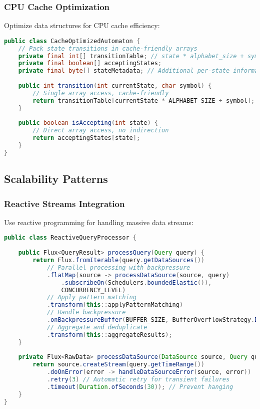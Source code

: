 \documentclass[11pt,a4paper]{article}
\begin{document}
\subsubsection{CPU Cache Optimization}

Optimize data structures for CPU cache efficiency:

\begin{lstlisting}[language=Java, caption=Cache-Friendly Data Structures]
public class CacheOptimizedAutomaton {
    // Pack state transitions in cache-friendly arrays
    private final int[] transitionTable; // state * alphabet_size + symbol = next_state
    private final boolean[] acceptingStates;
    private final byte[] stateMetadata; // Additional per-state information
    
    public int transition(int currentState, char symbol) {
        // Single array access, cache-friendly
        return transitionTable[currentState * ALPHABET_SIZE + symbol];
    }
    
    public boolean isAccepting(int state) {
        // Direct array access, no indirection
        return acceptingStates[state];
    }
}
\end{lstlisting}

\subsection{Scalability Patterns}

\subsubsection{Reactive Streams Integration}

Use reactive programming for handling massive data streams:

\begin{lstlisting}[language=Java, caption=Reactive Query Processing]
public class ReactiveQueryProcessor {
    
    public Flux<QueryResult> processQuery(Query query) {
        return Flux.fromIterable(query.getDataSources())
            // Parallel processing with backpressure
            .flatMap(source -> processDataSource(source, query)
                .subscribeOn(Schedulers.boundedElastic()), 
                CONCURRENCY_LEVEL)
            // Apply pattern matching
            .transform(this::applyPatternMatching)
            // Handle backpressure
            .onBackpressureBuffer(BUFFER_SIZE, BufferOverflowStrategy.DROP_OLDEST)
            // Aggregate and deduplicate
            .transform(this::aggregateResults);
    }
    
    private Flux<RawData> processDataSource(DataSource source, Query query) {
        return source.createStream(query.getTimeRange())
            .doOnError(error -> handleDataSourceError(source, error))
            .retry(3) // Automatic retry for transient failures
            .timeout(Duration.ofSeconds(30)); // Prevent hanging
    }
}
\end{lstlisting}
\end{document}
